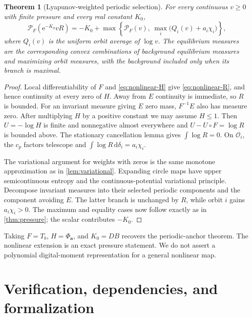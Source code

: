 \documentclass[11pt,a4paper]{article}
\numberwithin{equation}{section}
\newtheorem{theorem}{Theorem}[section]
\theoremstyle{definition}
\theoremstyle{remark}
\newcommand{\dd}{\,\mathrm d}
\newcommand{\ee}{\mathrm e}
\newcommand{\cO}{\mathcal O}
\newcommand{\PP}{\mathcal P}
\begin{document}
\begin{theorem}[Lyapunov-weighted periodic selection]
\label{thm:nonlinear}
For every continuous $v\ge0$ with finite pressure and every real
constant $K_0$,
\begin{equation}
 \PP_F(\ee^{-K_0}vR)
 =-K_0+\max\left\{\PP_F(v),\ 
             \max_i\bigl(Q_i(v)+a_i\chi_i\bigr)\right\},
 \label{eq:nonlinear-pressure}
\end{equation}
where $Q_i(v)$ is the uniform orbit average of $\log v$.
The equilibrium measures are the corresponding convex combinations
of background equilibrium measures and maximizing orbit measures,
with the background included only when its branch is maximal.
\end{theorem}
\begin{proof}
Local differentiability of $F$ and \cref{eq:nonlinear-H} give
\cref{eq:nonlinear-R}, and hence continuity at every zero of $H$.
Away from $E$ continuity is immediate, so $R$ is bounded.
For an invariant measure giving $E$ zero mass, $F^{-1}E$ also has
measure zero. After multiplying $H$ by a positive constant we may
assume $H\le1$. Then $U=-\log H$ is finite and nonnegative almost
everywhere and $U-U\circ F=\log R$ is bounded above.
The stationary cancellation lemma gives $\int\log R=0$.
On $\cO_i$, the $c_p$ factors telescope and
$\int\log R\dd\delta_i=a_i\chi_i$.

The variational argument for weights with zeros is the same monotone
approximation as in \cref{lem:variational}. Expanding circle maps
have upper semicontinuous entropy and the continuous-potential
variational principle. Decompose invariant measures into their
selected periodic components and the component avoiding $E$.
The latter branch is unchanged by $R$, while orbit $i$ gains
$a_i\chi_i>0$. The maximum and equality cases now follow exactly as
in \cref{thm:pressure}; the scalar contributes $-K_0$.
\end{proof}
Taking $F=T_b$, $H=\Phi_{\boldsymbol a}$, and $K_0=DB$ recovers the
periodic-anchor theorem. The nonlinear extension is an exact pressure
statement. We do not assert a polynomial digital-moment representation
for a general nonlinear map.

\section{Verification, dependencies, and formalization}
\label{sec:verification}
\end{document}
